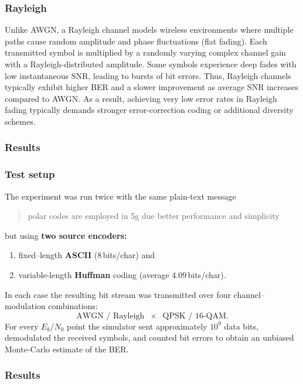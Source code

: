 \subsubsection{Rayleigh}

Unlike AWGN, a Rayleigh channel models wireless environments where multiple paths cause random amplitude and phase fluctuations (flat fading). Each transmitted symbol is multiplied by a randomly varying complex channel gain with a Rayleigh-distributed amplitude. Some symbols experience deep fades with low instantaneous SNR, leading to bursts of bit errors. Thus, Rayleigh channels typically exhibit higher BER and a slower improvement as average SNR increases compared to AWGN. As a result, achieving very low error rates in Rayleigh fading typically demands stronger error-correction coding or additional diversity schemes.

\subsubsection{Results}

\label{sec:channel_results}

\subsubsection*{Test setup}
The experiment was run twice with the same plain-text message

\begin{quote}
\ttfamily
polar codes are employed in 5g due better performance and simplicity
\end{quote}

\noindent
but using \textbf{two source encoders:}
\begin{enumerate}[label=(\roman*)]
\item fixed–length \textbf{ASCII} (8\,bits/char) and  
\item variable-length \textbf{Huffman} coding (average 4.09\,bits/char).
\end{enumerate}
In each case the resulting bit stream was transmitted over four channel–modulation combinations:
\[
\text{AWGN / Rayleigh}\;\;\times\;\;\text{QPSK / 16-QAM}.
\]
For every \(E_b/N_0\) point the simulator sent approximately \(10^9\) data bits,
demodulated the received symbols, and counted bit errors to obtain an unbiased
Monte-Carlo estimate of the BER.

\subsubsection*{Results}

